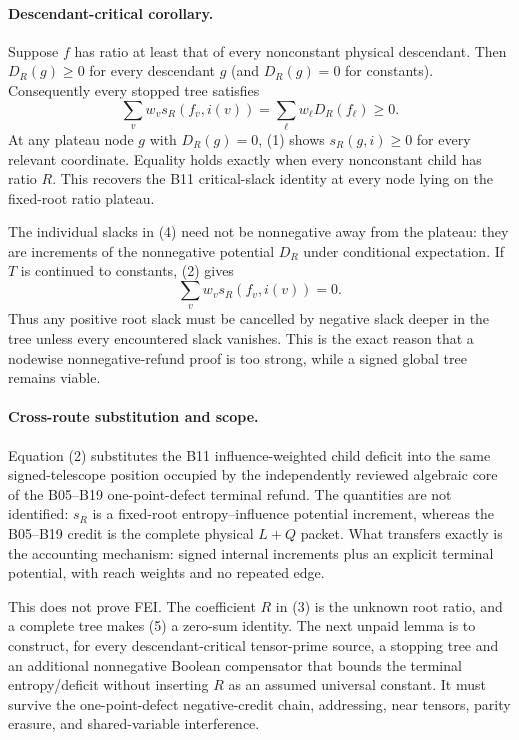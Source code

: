 \paragraph{Descendant-critical corollary.}
Suppose $f$ has ratio at least that of every nonconstant physical descendant.
Then $D_R(g)\ge0$ for every descendant $g$ (and $D_R(g)=0$ for constants).
Consequently every stopped tree satisfies
\[
 \sum_vw_vs_R(f_v,i(v))
 =\sum_\ell w_\ell D_R(f_\ell)\ge0.                    \tag{4}
\]
At any plateau node $g$ with $D_R(g)=0$, (1) shows
$s_R(g,i)\ge0$ for every relevant coordinate.  Equality holds exactly when
every nonconstant child has ratio $R$.  This recovers the B11 critical-slack
identity at every node lying on the fixed-root ratio plateau.

The individual slacks in (4) need not be nonnegative away from the plateau:
they are increments of the nonnegative potential $D_R$ under conditional
expectation.  If $T$ is continued to constants, (2) gives
\[
 \boxed{\sum_vw_vs_R(f_v,i(v))=0.}                      \tag{5}
\]
Thus any positive root slack must be cancelled by negative slack deeper in
the tree unless every encountered slack vanishes.  This is the exact reason
that a nodewise nonnegative-refund proof is too strong, while a signed global
tree remains viable.

\paragraph{Cross-route substitution and scope.}
Equation (2) substitutes the B11 influence-weighted child deficit into the
same signed-telescope position occupied by the independently reviewed
algebraic core of the B05--B19 one-point-defect terminal refund.  The
quantities are not identified: $s_R$ is a fixed-root entropy--influence
potential increment, whereas the B05--B19 credit is the complete physical
$L+Q$ packet.  What transfers exactly is the accounting mechanism: signed
internal increments plus an explicit terminal potential, with reach weights
and no repeated edge.

This does not prove FEI.  The coefficient $R$ in (3) is the unknown root
ratio, and a complete tree makes (5) a zero-sum identity.  The next unpaid
lemma is to construct, for every descendant-critical tensor-prime source, a
stopping tree and an additional nonnegative Boolean compensator that bounds
the terminal entropy/deficit without inserting $R$ as an assumed universal
constant.  It must survive the one-point-defect negative-credit chain,
addressing, near tensors, parity erasure, and shared-variable interference.
